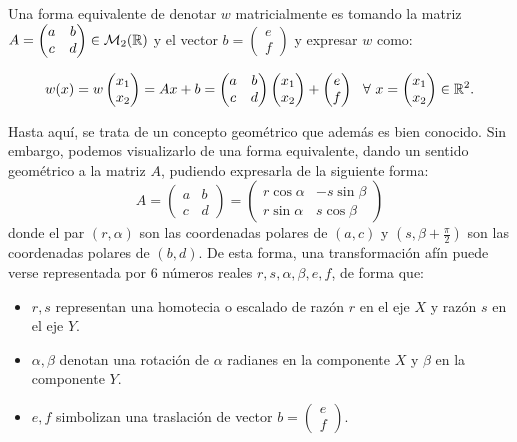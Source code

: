 Una forma equivalente de denotar $w$ matricialmente es tomando la matriz $A=\begin{pmatrix}
    a & b \\
    c & d
\end{pmatrix}\in\mathcal{M}_2(\mathbb{R})$ y el vector $b=\begin{pmatrix}
    e \\
    f
\end{pmatrix}$ y expresar $w$ como:

\begin{equation}
    w(x) =
    w\begin{pmatrix}
        x_1 \\
        x_2
    \end{pmatrix} = Ax + b = \begin{pmatrix}
        a & b \\
        c & d
    \end{pmatrix}\begin{pmatrix}
        x_1 \\
        x_2
    \end{pmatrix}+\begin{pmatrix}
        e \\
        f
    \end{pmatrix} \ \ \forall \ x = \begin{pmatrix}
        x_1 \\
        x_2
    \end{pmatrix}\in\mathbb{R}^2.
\end{equation}

Hasta aquí, se trata de un concepto geométrico que además es bien conocido. Sin embargo, podemos visualizarlo de una forma equivalente, dando un sentido geométrico a la matriz $A$, pudiendo expresarla de la siguiente forma:
\begin{equation}
    A = \begin{pmatrix}
        a & b \\
        c & d
    \end{pmatrix} = \begin{pmatrix}
        r\cos\alpha & -s\sin\beta \\
        r\sin\alpha & s\cos\beta
    \end{pmatrix}
\end{equation}
donde el par $(r,\alpha)$ son las coordenadas polares de $(a,c)$ y $(s,\beta+\frac \pi 2)$ son las coordenadas polares de $(b,d)$. De esta forma, una transformación afín puede verse representada por 6 números reales $r,s,\alpha,\beta,e,f$, de forma que:
\begin{itemize}
    \item $r,s$ representan una homotecia o escalado de razón $r$ en el eje $X$ y razón $s$ en el eje $Y$.
    \item $\alpha,\beta$ denotan una rotación de $\alpha$ radianes en la componente $X$ y $\beta$ en la componente $Y$.
    \item $e,f$ simbolizan una traslación de vector $b=\begin{pmatrix} e \\ f\end{pmatrix}$.
\end{itemize}

